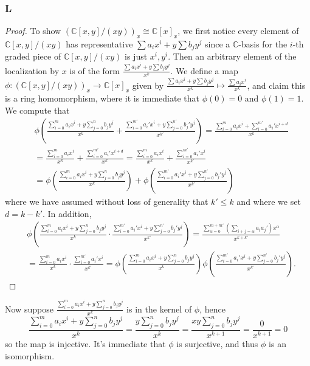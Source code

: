 \documentclass{article}
\newcommand{\C}{\mathbb{C}}
\theoremstyle{definition} %
\begin{document}
\subsubsection{L}\label{3.2.L}
\begin{proof}
    To show $(\C[x,y]/(xy))_x\cong \C[x]_x$, we first notice every element of $\C[x,y]/(xy)$ has representative $\sum a_i x^i+ y \sum b_j y^j$ since a $\C$-basis for the $i$-th graded piece of $\C[x,y]/(xy)$ is just $x^i,y^i$. Then an arbitrary element of the localization by $x$ is of the form $\frac{\sum a_i x^i+ y \sum b_j y^j}{x^k}$. We define a map $\phi:(\C[x,y]/(xy))_x\to \C[x]_x$ given by $\frac{\sum a_i x^i+ y \sum b_j y^j}{x^k}\mapsto \frac{\sum a_i x^i}{x^k}$, and claim this is a ring homomorphism, where it is immediate that $\phi(0)=0$ and $\phi(1)=1$. We compute that
    \begin{align*}
        &\phi(\frac{\sum_{i=0}^m a_i x^i+ y \sum_{j=0}^n b_j y^j}{x^k}+\frac{\sum_{i=0}^{m'} a_i' x^i+ y \sum_{j=0}^{n'} b_j' y^j}{x^{k'}})=\frac{\sum_{i=0}^m a_i x^i+\sum_{i=0}^{m'}a_i'x^{i+d}}{x^k}\\
        &=\frac{\sum_{i=0}^m a_i x^i}{x^k}+\frac{\sum_{i=0}^{m'}a_i'x^{i+d}}{x^k}=\frac{\sum_{i=0}^m a_i x^i}{x^k}+\frac{\sum_{i=0}^{m'}a_i'x^{i}}{x^{k'}}\\
        &=\phi(\frac{\sum_{i=0}^m a_i x^i+ y \sum_{j=0}^n b_j y^j}{x^k})+\phi(\frac{\sum_{i=0}^{m'} a_i' x^i+ y \sum_{j=0}^{n'} b_j' y^j}{x^{k'}})
    \end{align*}
    where we have assumed without loss of generality that $k'\le k$ and where we set $d=k-k'$. In addition,
    \begin{align*}
        &\phi(\frac{\sum_{i=0}^m a_i x^i+ y \sum_{j=0}^n b_j y^j}{x^k} \cdot \frac{\sum_{i=0}^{m'} a_i' x^i+ y \sum_{j=0}^{n'} b_j' y^j}{x^{k'}})=\frac{\sum_{\alpha=0}^{m+m'} (\sum_{i+j=\alpha} a_ia_j')x^\alpha}{x^{k+k'}}\\
        &=\frac{\sum_{i=0}^m a_i x^i}{x^k} \cdot \frac{\sum_{i=0}^{m'} a_i' x^i}{x^{k'}}=\phi(\frac{\sum_{i=0}^m a_i x^i+ y \sum_{j=0}^n b_j y^j}{x^k})\phi( \frac{\sum_{i=0}^{m'} a_i' x^i+ y \sum_{j=0}^{n'} b_j' y^j}{x^{k'}}).
    \end{align*}
\end{proof}
Now suppose $\frac{\sum_{i=0}^m a_i x^i+ y \sum_{j=0}^n b_j y^j}{x^k}$ is in the kernel of $\phi$, hence
\[
\frac{\sum_{i=0}^m a_i x^i+ y \sum_{j=0}^n b_j y^j}{x^k}=\frac{y \sum_{j=0}^n b_j y^j}{x^k} = \frac{xy \sum_{j=0}^n b_j y^j}{x^{k+1}}=\frac{0}{x^{k+1}}=0
\]
so the map is injective. It's immediate that $\phi$ is surjective, and thus $\phi$ is an isomorphism.
\end{document}
